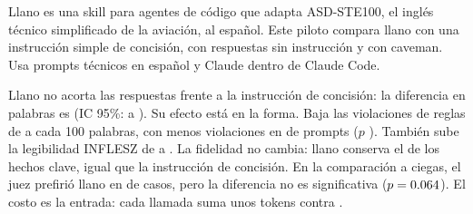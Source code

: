 Llano es una skill para agentes de código que adapta ASD-STE100, el inglés técnico simplificado de la aviación, al español. Este piloto compara llano con una instrucción simple de concisión, con respuestas sin instrucción y con caveman. Usa \evalPrompts{} prompts técnicos en español y Claude \evalModel{} dentro de Claude Code.

Llano no acorta las respuestas frente a la instrucción de concisión: la diferencia en palabras es \deltaWordsTerse{} (IC 95\%: \deltaWordsTerseLo{} a \deltaWordsTerseHi{}). Su efecto está en la forma. Baja las violaciones de reglas de \tersePerHundred{} a \llanoPerHundred{} cada 100 palabras, con menos violaciones en \violBetterTerse{} de \evalPrompts{} prompts ($p$ \violPTerse). También sube la legibilidad INFLESZ de \terseInflesz{} a \llanoInflesz. La fidelidad no cambia: llano conserva el \llanoFidelity{} de los hechos clave, igual que la instrucción de concisión. En la comparación a ciegas, el juez prefirió llano en \winsTerse{} de \evalPrompts{} casos, pero la diferencia no es significativa ($p = 0.064$). El costo es la entrada: cada llamada suma unos \llanoInputTokens{} tokens contra \terseInputTokens.
